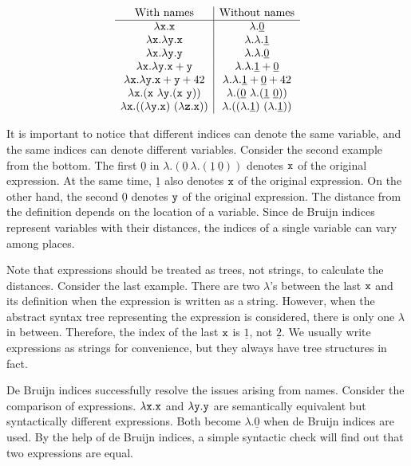 \[
\begin{array}{c|c}
\text{With names} & \text{Without names} \\ \hline
\lambda \cx.\cx & \lambda.\underline{0} \\
\lambda \cx.\lambda \cy.\cx  & \lambda.\lambda.\underline{1} \\
\lambda \cx.\lambda \cy.\cy & \lambda.\lambda.\underline{0} \\
\lambda \cx.\lambda \cy.\cx+\cy & \lambda.\lambda.\underline{1}+\underline{0} \\
\lambda \cx.\lambda \cy.\cx+\cy+42 & \lambda.\lambda.\underline{1}+\underline{0}+42 \\
\lambda \cx.(\cx\ \lambda \cy.(\cx\ \cy)) & \lambda.(\underline{0}\ \lambda.(\underline{1}\ \underline{0})) \\
\lambda \cx.((\lambda \cy.\cx)\ (\lambda \cz.\cx)) & \lambda.((\lambda.\underline{1})\ (\lambda.\underline{1}))
\end{array}
\]

It is important to notice that different indices can denote the same variable,
and the same indices can denote different variables. Consider the second example
from the bottom. The first $\underline{0}$ in $\lambda.(\underline{0}\
\lambda.(\underline{1}\ \underline{0}))$ denotes $\texttt{x}$ of the original
expression. At the same time, $\underline{1}$ also denotes $\texttt{x}$ of the
original expression. On the other hand, the second $\underline{0}$ denotes
$\texttt{y}$ of the original expression. The distance from the definition depends on the
location of a variable. Since de Bruijn indices represent variables with their
distances, the indices of a single variable can vary among places.

Note that expressions should be treated as trees, not strings, to calculate the
distances. Consider the last example. There are two $\lambda$’s between the last
$\texttt{x}$ and its definition when the expression is written as a string. However,
when the abstract syntax tree representing the expression is considered, there is
only one $\lambda$ in between. Therefore, the index of the last $\texttt{x}$ is
$\underline{1}$, not $\underline{2}$. We usually write expressions as strings for
convenience, but they always have tree structures in fact.

De Bruijn indices successfully resolve the issues arising from names. Consider
the comparison of expressions. $\lambda \texttt{x}.\texttt{x}$ and $\lambda \texttt{y}.\texttt{y}$
are semantically equivalent but syntactically different expressions.
Both become $\lambda.\underline{0}$ when de Bruijn indices are used. By the help
of de Bruijn indices, a simple syntactic check will find out that two expressions
are equal.

